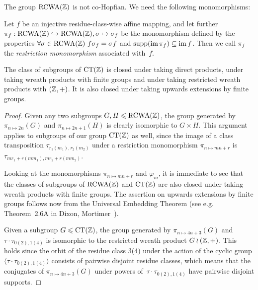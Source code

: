 \documentclass{amsart}
\theoremstyle{definition} \newtheorem{CTZDefinition}{Definition}[section]
\theoremstyle{plain}      \newtheorem{CTZPropertiesTheorem}[CTZDefinition]{Theorem}
\theoremstyle{plain}      \newtheorem{CTZSubgroupsTheorem}[CTZDefinition]{Theorem}
\theoremstyle{definition} \newtheorem{RcwaMappingDefinition}{Definition}[section]
\theoremstyle{definition} \newtheorem{RCWADefinition}[RcwaMappingDefinition]{Definition}
\theoremstyle{plain}      \newtheorem{CTZNotFinitelyGeneratedTheorem}
\theoremstyle{definition} \newtheorem{CTZSmEmbeddingDefinition}[RcwaMappingDefinition]{Definition}
\theoremstyle{plain}      \newtheorem{CTZHighlyTransitiveTheorem}[RcwaMappingDefinition]{Theorem}
\theoremstyle{plain}      \newtheorem{CTZTorsionElementsDivisibleTheorem}
\theoremstyle{plain}      \newtheorem{CTLemma}{Lemma}[section]
\theoremstyle{plain}      \newtheorem{IntegralCommutatorLemma}[CTLemma]{Lemma}
\theoremstyle{plain}      \newtheorem{NormalSubgroupContainsIntegralElementLemma}[CTLemma]{Lemma}
\theoremstyle{plain}      \newtheorem{CTZSimpleTheorem}[CTLemma]{Theorem}
\theoremstyle{remark}     \newtheorem{CTZSimpleRemark}[CTLemma]{Remark}
\theoremstyle{definition} \newtheorem{CTPZDefinition}[CTLemma]{Definition}
\theoremstyle{plain}      \newtheorem{CTPZSimpleCorollary}[CTLemma]{Corollary}
\theoremstyle{plain}      \newtheorem{CTPZSimpleProblem}[CTLemma]{Problem}
\theoremstyle{plain}      \newtheorem{FnPSL2ZEmbeddingTheorem}{Theorem}[section]
\theoremstyle{plain}      \newtheorem{FreeProductEmbeddingTheorem}[FnPSL2ZEmbeddingTheorem]{Theorem}
\theoremstyle{definition} \newtheorem{RestrictionMonomorphismDefinition}
\theoremstyle{plain}      \newtheorem{DirectAndWreathProductsEmbeddingTheorem}
\theoremstyle{plain}      \newtheorem{DirectAndWreathProductsEmbeddingCorollary}
\theoremstyle{definition} \newtheorem{CTintZDefinition}[FnPSL2ZEmbeddingTheorem]{Definition}
\theoremstyle{plain}      \newtheorem{CTintZSimpleTheorem}[FnPSL2ZEmbeddingTheorem]{Theorem}
\theoremstyle{definition} \newtheorem{KernelDefinition}{Definition}[section]
\theoremstyle{definition} \newtheorem{TameWildDefinition}[KernelDefinition]{Definition}
\theoremstyle{definition} \newtheorem{SimpleSupergroupsDefinition}[KernelDefinition]{Definition}
\theoremstyle{definition} \newtheorem{CSCRDefinition}[KernelDefinition]{Definition}
\theoremstyle{plain}      \newtheorem{SimpleSupergroupsGeneratorsTheorem}[KernelDefinition]{Theorem}
\theoremstyle{plain}      \newtheorem{SimpleSupergroupsTheorem}[KernelDefinition]{Theorem}
\theoremstyle{plain}      \newtheorem{SimpleSupergroupsTransitivityTheorem}
\theoremstyle{plain}      \newtheorem{TameGenerationConjecture}[KernelDefinition]{Conjecture}
\theoremstyle{remark}     \newtheorem{TameGenerationRemark}[KernelDefinition]{Remark}
\begin{document}
\noindent The group \(\RCWA{\ZZ}\) is not co-Hopfian.
We need the following monomorphisms:

\begin{RestrictionMonomorphismDefinition} \label{RestrictionMonomorphismDefinition}
  Let \(f\) be an injective residue-class-wise affine mapping, and let further
  \(\pi_f: \RCWA{\ZZ} \hookrightarrow \RCWA{\ZZ}, \sigma \mapsto \sigma_f\) be the
  monomorphism defined by the properties \(\forall \sigma \in \RCWA{\ZZ} \ f \sigma_f = \sigma f\)
  and \(\supp{\im \pi_f} \subseteq \im f\).
  Then we call \(\pi_f\) the \emph{restriction monomorphism} associated with~\(f\).
\end{RestrictionMonomorphismDefinition}

\begin{DirectAndWreathProductsEmbeddingTheorem} \label{DirectAndWreathProductsEmbeddingTheorem}
  The class of subgroups of \(\CT{\ZZ}\) is closed under taking \mbox{direct} pro\-ducts, under
  taking wreath products with finite groups and \mbox{under} taking restricted wreath products
  with \((\mathbb{Z},+)\). It is also closed under taking upwards extensions by finite groups.
\end{DirectAndWreathProductsEmbeddingTheorem}
\begin{proof}
  Given any two subgroups \(G, H \leq \RCWA{\ZZ}\), the group generated by
  \(\pi_{n \mapsto 2n}(G)\) and \(\pi_{n \mapsto 2n+1}(H)\) is clearly isomorphic
  to \(G \times H\). This argument applies to subgroups of our group \(\CT{\ZZ}\) as well,
  since the image of a class transposition \(\tau_{r_1(m_1),r_2(m_2)}\) under
  a restriction monomorphism \(\pi_{n \mapsto mn+r}\) is \(\tau_{mr_1+r(mm_1),mr_2+r(mm_2)}\).

  Looking at the monomorphisms \(\pi_{n \mapsto mn+r}\) and \(\varphi_m\), it is immediate to see
  that the classes of subgroups of \(\RCWA{\ZZ}\) and \(\CT{\ZZ}\) are also closed under
  taking wreath pro\-ducts with finite groups. The assertion on upwards extensions by finite
  groups follows now from the Universal Embedding Theorem (see e.g. Theorem~2.6A in Dixon,
  Mortimer~\cite{DixonMortimer96}).

  Given a subgroup \(G \leq \CT{\ZZ}\), the group generated by \(\pi_{n \mapsto 4n+3}(G)\) and
  \(\tau \cdot \tau_{0(2),1(4)}\) is isomorphic to the restricted wreath product \(G \wr (\mathbb{Z},+)\).
  This holds since the orbit of the residue class 3(4) under the action of the cyclic group
  \(\langle \tau \cdot \tau_{0(2),1(4)} \rangle\) consists of pairwise disjoint residue classes,
  which means that the conjugates of \(\pi_{n \mapsto 4n+3}(G)\) under powers
  of~\(\tau \cdot \tau_{0(2),1(4)}\) have pairwise disjoint supports.
\end{proof}
\end{document}
